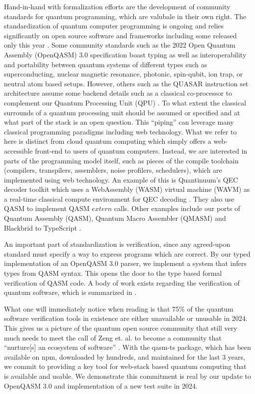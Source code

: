\documentclass{article}
\begin{document}
Hand-in-hand with formalization efforts are the development of community standards for quantum programming, which are valubale in their own right. The standardization of quantum computer programming is ongoing \cite{di_matteo_abstraction_2024, Cross_2022} and relies significantly on open source software and frameworks including some released only this year \cite{seidel2024qrispframeworkcompilablehighlevel, qdmi}.
Some community standards such as the 2022 Open Quantum Assembly (OpenQASM) 3.0 specification boast typing as well as interoperability and portability between quantum systems of different types such as superconducting, nuclear magnetic resonance, photonic, spin-qubit, ion trap, or neutral atom based setups. However, others such as the QUASAR instruction set architecture assume some backend details such as a classical co-processor to complement our Quantum Processing Unit (QPU) \cite{shammah_open_2024}. To what extent the classical surrounds of a quantum processing unit should be assumed or specified and at what part of the stack is an open question. This ``piping'' can leverage many classical programming paradigms including web technology. What we refer to here is distinct from cloud quantum computing which simply offers a web-accessible front-end to users of quantum computers. Instead, we are interested in parts of the programming model itself, such as pieces of the compile toolchain (compilers, transpilers, assemblers, noise profilers, schedulers), which are implemented using web technology. An example of this is Quantinuum's QEC decoder toolkit which uses a WebAssembly (WASM) virtual machine (WAVM) as a real-time classical compute environment for QEC decoding \cite{noauthor_qec_nodate}. They also use QASM to implement QASM $extern$ calls. Other examples include our ports of Quantum Assembly (QASM), Quantum Macro Assembler (QMASM) and Blackbrid to TypeScript \cite{edwards_three_2023}.

An important part of standardization is verification, since any agreed-upon standard must specify a way to express programs which are correct. By our typed implementation of an OpenQASM 3.0 parser, we implement a system that infers types from QASM syntax. This opens the door to the type based formal verification of QASM code. A body of work exists regarding the verification of quantum software, which is summarized in \cite{exman_verification_2024}.

What one will immediately notice when reading \cite{exman_verification_2024} is that 75\% of the quantum software verification tools in existence are either unavailable or unusable in 2024. This gives us a picture of the quantum open source community that still very much needs to meet the call of Zeng et. al. to become a community that ``nurture[s] an ecosystem of software'' \cite{zeng_first_2017}. With the qasm-ts package, which has been available on npm, downloaded by hundreds, and maintained for the last 3 years, we commit to providing a key tool for web-stack based quantum computing that is available and usable. We demonstrate this commitment is real by our update to OpenQASM 3.0 and implementation of a new test suite in 2024.
\end{document}
